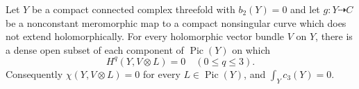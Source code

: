 
\begin{proposition}\label{cdp:st:E2}
Let $Y$ be a compact connected complex threefold with $b_2(Y)=0$ and
let $g:Y\dashrightarrow C$ be a nonconstant meromorphic map to a
compact nonsingular curve which does not extend holomorphically.
For every holomorphic vector bundle $V$ on $Y$, there is a dense open
subset of each component of $\operatorname{Pic}(Y)$ on which
\[
 H^q(Y,V\otimes L)=0\quad(0\leq q\leq3).
\]
Consequently $\chi(Y,V\otimes L)=0$ for every $L\in\operatorname{Pic}(Y)$,
and $\int_Yc_3(Y)=0$.
\end{proposition}

